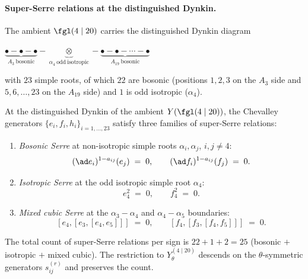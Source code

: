\paragraph{Super-Serre relations at the distinguished Dynkin.}
The ambient $\fgl(4 \mid 20)$ carries the distinguished Dynkin
diagram
\begin{center}
 $\underbrace{\bullet - \bullet - \bullet}_{A_3\ \mathrm{bosonic}} -
 \underbrace{\otimes}_{\alpha_4\ \mathrm{odd\ isotropic}} -
 \underbrace{\bullet - \bullet - \cdots - \bullet}_{A_{19}\ \mathrm{bosonic}}$
\end{center}
with $23$ simple roots, of which $22$ are bosonic (positions
$1, 2, 3$ on the $A_3$ side and $5, 6, \ldots, 23$ on the $A_{19}$
side) and $1$ is odd isotropic ($\alpha_4$).

\begin{theorem}
\label{thm:r10-super-Serre-ch}
At the distinguished Dynkin of the ambient $Y(\fgl(4 \mid 20))$, the
Chevalley generators $\{e_i, f_i, h_i\}_{i = 1, \ldots, 23}$ satisfy
three families of super-Serre relations:
\begin{enumerate}[label=\textup{(S\arabic*)}]
\item \emph{Bosonic Serre} at non-isotropic simple roots
 $\alpha_i, \alpha_j$, $i, j \neq 4$:
\begin{equation}
 \label{eq:r10-bosonic-Serre-ch}
 (\ad e_i)^{1 - a_{ij}}(e_j) \;=\; 0,
 \qquad
 (\ad f_i)^{1 - a_{ij}}(f_j) \;=\; 0.
\end{equation}
\item \emph{Isotropic Serre} at the odd isotropic simple root
 $\alpha_4$:
\begin{equation}
 \label{eq:r10-isotropic-Serre-ch}
 e_4^2 \;=\; 0, \qquad f_4^2 \;=\; 0.
\end{equation}
\item \emph{Mixed cubic Serre} at the $\alpha_3 - \alpha_4$ and
 $\alpha_4 - \alpha_5$ boundaries:
\begin{equation}
 \label{eq:r10-mixed-Serre-ch}
 [e_4, [e_3, [e_4, e_5]]] \;=\; 0,
 \qquad
 [f_4, [f_3, [f_4, f_5]]] \;=\; 0.
\end{equation}
\end{enumerate}
The total count of super-Serre relations per sign is
$22 + 1 + 2 = 25$ (bosonic $+$ isotropic $+$ mixed cubic). The
restriction to $Y_\theta^{(4 \mid 20)}$ descends on the
$\theta$-symmetric generators $s^{(r)}_{ij}$ and preserves the
count.
\end{theorem}

